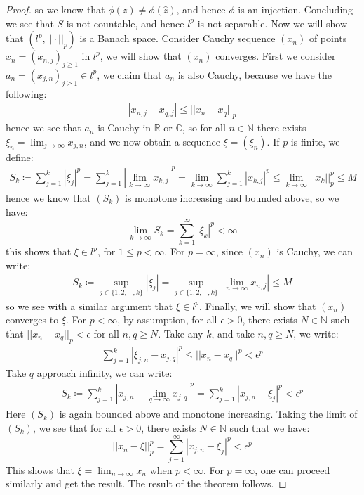 \documentclass[11pt]{book}
\theoremstyle{break}
\theoremstyle{break}
\newcommand{\R}{\mathbb{R}}
\newcommand{\N}{\mathbb{N}}
\newcommand{\C}{\mathbb{C}}
\begin{document}
\begin{proof}
so we know that $\phi(z) \neq \phi (\hat{z})$, and hence $\phi$ is an injection. Concluding we see that $S$ is not countable, and hence $l^p$ is not separable. Now we will show that $(l^p, ||\cdot ||_p)$ is a Banach space. Consider Cauchy sequence $(x_n)$ of points $x_n = (x_{n,j})_{j\geq 1}$ in $l^p$, we will show that $(x_n)$ converges. First we consider $a_n = (x_{j,n})_{j\geq 1} \in l^p$, we claim that $a_n$ is also Cauchy, because we have the following:
\begin{align*}
|x_{n,j} - x_{q,j}| \leq ||x_n - x_q||_p
\end{align*}
hence we see that $a_n$ is Cauchy in $\R$ or $\C$, so for all $n \in \N$ there exists $\xi_n  = \lim_{j \to \infty }x_{j,n}$, and we now obtain a sequence $\xi = (\xi_n)$. If $p$ is finite, we define:
\begin{align*}
S_k \coloneqq \sum_{j=1}^k |\xi_j |^p = \sum_{j=1}^k \left|\lim_{k \to \infty}x_{k,j}\right|^p = \lim_{k\to \infty} \sum_{j=1}^k |x_{k,j}|^p \leq \lim_{k\to \infty}||x_k||_p^p \leq M
\end{align*}
hence we know that $(S_k)$ is monotone increasing and bounded above, so we have:
$$\lim_{k \to \infty}S_k = \sum_{k=1}^\infty |\xi_k|^p < \infty$$ 
this shows that $\xi \in l^p$, for $1 \leq p < \infty$. For $p =\infty$, since $(x_n)$ is Cauchy, we can write:
\begin{align*}
S_k \coloneqq \sup_{j\in \{ 1,2,\cdots, k\}}|\xi_j| = \sup_{j\in \{1,2,\cdots, k\}}\left|\lim_{n\to \infty} x_{n,j}\right| \leq M
\end{align*}
so we see with a similar argument that $\xi \in l^p$. Finally, we will show that $(x_n)$ converges to $\xi$. For $p < \infty$, by assumption, for all $\epsilon>0$, there exists $N \in \N$ such that $||x_n-x_q||_p < \epsilon$ for all $n,q \geq N$. Take any $k$, and take $n,q\geq N$, we write: 
\begin{align*}
\sum_{j=1}^k |\xi_{j,n} -x_{j,q}|^p \leq ||x_n - x_q||^p < \epsilon^p
\end{align*}
Take $q$ approach infinity, we can write:
\begin{align*}
S_k \coloneqq \sum_{j=1}^k |x_{j,n} - \lim_{q\to \infty}x_{j,q}|^p= \sum_{j=1}^k |x_{j,n} - \xi_j|^p < \epsilon^p
\end{align*}
Here $(S_k)$ is again bounded above and monotone increasing. Taking the limit of $(S_k)$, we see that for all $\epsilon>0$, there exists $N \in \N$ such that we have:
$$||x_n - \xi||_p^p = \sum_{j=1}^\infty |x_{j,n}- \xi_j|^p < \epsilon^p$$
This shows that $\xi = \lim_{n\to \infty}x_n$ when $p < \infty$. For $p=\infty$, one can proceed similarly and get the result. The result of the theorem follows.
\end{proof}
\end{document}
